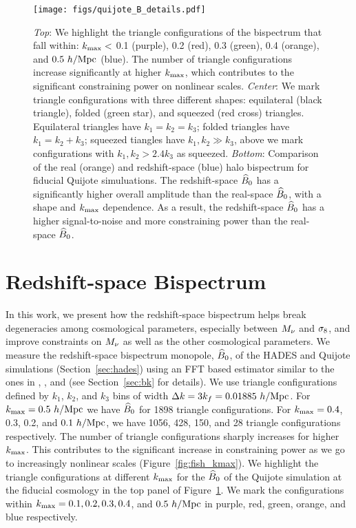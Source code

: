 \begin{figure}
\begin{center}
    \texttt{[image: figs/quijote\_B\_details.pdf]}
    \caption{
        {\em Top}: We highlight the triangle configurations of the bispectrum that fall within: 
        $k_{\rm max} <$ 0.1 (purple), 0.2 (red), 0.3 (green), 0.4 (orange), and $0.5~h/{\rm Mpc}$ (blue). The number of 
        triangle configurations increase significantly at higher $k_{\rm max}$, which contributes to the 
        significant constraining power on nonlinear scales. 
        {\em Center}: We mark triangle configurations with three different shapes:
        equilateral (black triangle), folded (green star), and squeezed (red cross) triangles. Equilateral 
        triangles have $k_1 = k_2 = k_3$; folded triangles have $k_1 = k_2 + k_3$; squeezed tiangles have 
        $k_1, k_2 \gg k_3$, above we mark configurations with $k_1, k_2 > 2.4k_3$ as squeezed. 
        {\em Bottom}: Comparison of the real (orange) and redshift-space (blue) halo bispectrum for 
        fiducial Quijote simuluations. The redshift-space $\widehat{B}_0$ has a significantly higher 
        overall amplitude than the real-space $\widehat{B}_0$, with a shape and $k_{\rm max}$ dependence. 
        As a result, the redshift-space $\widehat{B}_0$ has a higher signal-to-noise and more 
        constraining power than the real-space $\widehat{B}_0$.  
    } 
\label{fig:bk_details}
\end{center}
\end{figure}
\section{Redshift-space Bispectrum} \label{sec:bk_details}
In this work, we present how the redshift-space bispectrum helps break degeneracies 
among cosmological parameters, especially between $M_\nu$ and $\sigma_8$, and improve 
constraints on $M_\nu$ as well as the other cosmological parameters. We measure 
the redshift-space bispectrum monopole, $\widehat{B}_0$, of the HADES and Quijote simulations 
(Section~\ref{sec:hades}) using an FFT based estimator similar to the ones in 
\cite{sefusatti2005a}, \cite{scoccimarro2015}, and \cite{sefusatti2016} 
(see Section~\ref{sec:bk} for details). We use triangle configurations defined by 
$k_1$, $k_2$, and $k_3$ bins of width $\Delta k = 3k_f = 0.01885~h/{\rm Mpc}$. 
For $k_{\rm max} = 0.5~h/{\rm Mpc}$ we have $\widehat{B}_0$ for 1898 
triangle configurations. For $k_{\rm max} = 0.4$, 0.3, 0.2, and $0.1~h/{\rm Mpc}$, 
we have 1056, 428, 150, and 28 triangle configurations respectively. The number
of triangle configurations sharply increases for higher $k_{\rm max}$. This
contributes to the significant increase in constraining power as we go to increasingly 
nonlinear scales (Figure~\ref{fig:fish_kmax}). We highlight the triangle 
configurations at different $k_{\rm max}$ for the $\widehat{B}_0$ of the Quijote simulation 
at the fiducial cosmology in the top panel of Figure~\ref{fig:bk_details}. We mark 
the configurations within $k_{\rm max} = 0.1, 0.2, 0.3, 0.4$, and $0.5~h/{\rm Mpc}$ 
in purple, red, green, orange, and blue respectively. 

